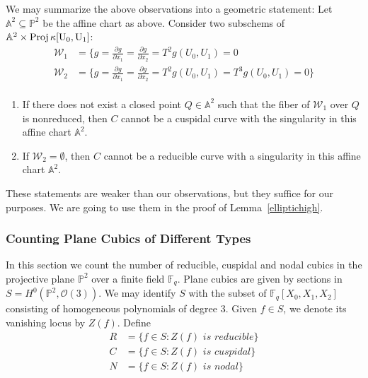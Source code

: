 \documentclass[12pt]{article}
\theoremstyle{plain}
\theoremstyle{definition}
\newcommand{\IA}{\mathbb{A}}
\newcommand{\IF}{\mathbb{F}}
\newcommand{\IP}{\mathbb{P}}
\newcommand{\sO}{\mathcal{O}}
\newcommand{\Proj}{\rm Proj\,}
\newcommand{\<}{\langle}
\renewcommand{\>}{\rangle}
\newcommand{\p}{\partial}
\newcommand{\sW}{\mathcal{W}}
\begin{document}
We may summarize the above observations into a geometric statement: Let $\IA^2 \subseteq \IP^2$ be the affine chart as above. Consider two subschems of $\IA^2 \times \Proj \kappa[U_0, U_1]$: 
\begin{align*}
\sW_1 &= \{ g = \frac{\p g}{\p x_1} = \frac{\p g}{\p x_2} = T^2 g(U_0, U_1) = 0 \\
\sW_2 &= \{ g = \frac{\p g}{\p x_1} = \frac{\p g}{\p x_2} = T^2 g(U_0, U_1) = T^3 g(U_0, U_1) = 0 \} \\
\end{align*} 
\begin{enumerate}
\item If there does not exist a closed point $Q \in \IA^2$ such that the fiber of $\sW_1$ over $Q$ is nonreduced, then $C$ cannot be a cuspidal curve with the singularity in this affine chart $\IA^2$. 
\item If $\sW_2 = \emptyset$, then $C$ cannot be a reducible curve with a singularity in this affine chart $\IA^2$. 
\end{enumerate}
These statements are weaker than our observations, but they suffice for our purposes. We are going to use them in the proof of Lemma~\ref{elliptichigh}. 


\subsubsection{Counting Plane Cubics of Different Types}
In this section we count the number of reducible, cuspidal and nodal cubics in the projective plane $\IP^2$ over a finite field $\IF_q$. Plane cubics are given by sections in $S = H^0(\IP^2, \sO(3))$. We may identify $S$ with the subset of $\IF_q[X_0, X_1, X_2]$ consisting of homogeneous polynomials of degree $3$. Given $f \in S$, we denote its vanishing locus by $Z(f)$. Define 
\begin{align*}
R &= \{ f \in S : Z(f) \textit{ is reducible} \} \\
C &= \{ f \in S : Z(f) \textit{ is cuspidal} \} \\
N &= \{ f \in S : Z(f) \textit{ is nodal} \}
\end{align*}
\end{document}
